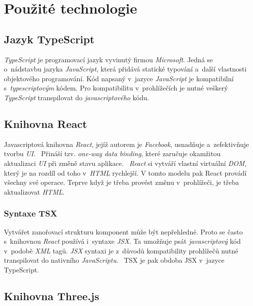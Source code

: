 \documentclass[a4paper,12pt]{article}
\begin{document}
\section{Použité technologie}

\subsection{Jazyk TypeScript}

\textit{TypeScript} je programovací jazyk vyvinutý firmou \textit{Microsoft}. Jedná se o~nádstavbu jazyka \textit{JavaScript}, která přidává statické typování a~další vlastnosti objektového programování. Kód napsaný v~jazyce \textit{JavaScript} je kompatibilní s~\textit{typescriptovým} kódem. Pro kompatibilitu v~prohlížečích je nutné veškerý \textit{TypeScript} transpilovat do \textit{javascriptového} kódu.~\cite{typescript}

\subsection{Knihovna React}

Javascriptová knihovna \textit{React}, jejíž autorem je \textit{Facebook}, usnadňuje a~zefektivňuje tvorbu \textit{UI}.~\cite{reactbook} Přináší tzv. \textit{one-way data binding}, které zaručuje okamžitou aktualizaci \textit{UI} při změně stavu aplikace.~\cite{onewaydatabinding} \textit{React} si vytváří vlastní virtuální \textit{DOM}, který je na rozdíl od toho v~\textit{HTML} rychlejší. V tomto modelu pak React provádí všechny své operace. Teprve když je třeba provést změnu v~prohlížeči, je třeba  aktualizovat \textit{HTML}.~\cite{reactbook}

\subsubsection{Syntaxe TSX}

Vytvářet zanořovací strukturu komponent může být nepřehledné. Proto se často s~knihovnou \textit{React} používá i~syntaxe \textit{JSX}. Ta umožňuje psát \textit{javascriptový} kód v~podobě \textit{XML} tagů. \textit{JSX} syntaxi je z~důvodů kompatibility prohlížečů nutné transpilovat do nativního \textit{JavaScriptu}.~\cite{reactbook} TSX je pak obdoba JSX v~jazyce TypeScript.



\subsection{Knihovna Three.js}
\end{document}
